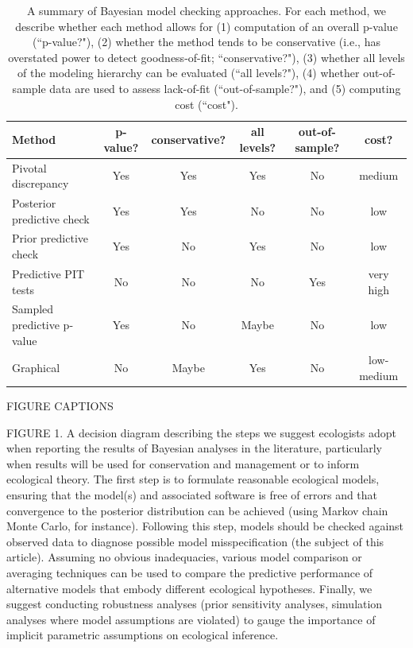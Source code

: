 \documentclass[12pt,english]{article}
\begin{document}
\begin{spacing}{1.9}
\begin{table}[ht]
\caption{A summary of Bayesian model checking approaches.  For each method, we describe whether each method allows for (1) computation of an overall p-value (``p-value?"), (2) whether the method tends to be conservative (i.e., has overstated power to detect goodness-of-fit; ``conservative?"), (3) whether all levels of the modeling hierarchy can be evaluated (``all levels?"), (4) whether out-of-sample data are used to assess lack-of-fit (``out-of-sample?"), and (5) computing cost (``cost").
}
\label{tab:discrepancy}
\centering
\begin{tabular}{lccccc}
  \hline
  Method & p-value? & conservative? & all levels? & out-of-sample?  & cost?\\
  \hline
  Pivotal discrepancy & Yes & Yes & Yes & No & medium \\
  Posterior predictive check & Yes & Yes & No & No & low \\
  Prior predictive check & Yes & No & Yes & No & low \\
  Predictive PIT tests & No & No & No & Yes & very high \\
  Sampled predictive p-value & Yes & No & Maybe & No & low \\
  Graphical & No & Maybe & Yes & No & low-medium \\
\hline
\end{tabular}
\end{table}
\pagebreak

FIGURE CAPTIONS

FIGURE 1.  A decision diagram describing the steps we suggest ecologists adopt when reporting the results of Bayesian analyses in the literature, particularly when results will be used for conservation and management or to inform ecological theory.  The first step is to formulate reasonable ecological models, ensuring that the model(s) and associated software is free of errors and that convergence to the posterior distribution can be achieved (using Markov chain Monte Carlo, for instance).  Following this step, models should be checked against observed data to diagnose possible model misspecification (the subject of this article).  Assuming no obvious inadequacies, various model comparison or averaging techniques can be used to compare the predictive performance of alternative models that embody different ecological hypotheses.  Finally, we suggest conducting robustness analyses (prior sensitivity analyses, simulation analyses where model assumptions are violated) to gauge the importance of implicit parametric assumptions on ecological inference.


\end{spacing}
\end{document}

